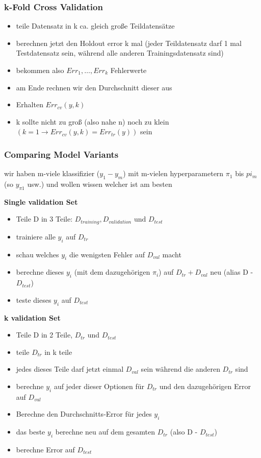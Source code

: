 \documentclass[11pt,a4paper]{article}
\begin{document}
\begin{flushleft}
\subsubsection{k-Fold Cross Validation}
\begin{itemize}
\item teile Datensatz in k ca. gleich große  Teildatensätze
\item berechnen jetzt den Holdout error k mal (jeder Teildatensatz darf 1 mal Testdatensatz sein, während alle anderen Trainingsdatensatz sind) 
\item bekommen also $Err_1, … , Err_k $  Fehlerwerte
\item am Ende rechnen wir den Durchschnitt dieser aus
\item Erhalten $Err_{cv}(y,k)$ 
\item k sollte nicht zu groß (also nahe n) noch zu klein $(k = 1 → Err_{cv}(y,k) = Err_{tr}(y))$ sein 
\end{itemize}

\subsubsection{Comparing Model Variants}
wir haben m-viele klassifizier ($y_1 - y_m$) mit m-vielen hyperparametern $\pi_1$ bis $pi_m$ (so $y_{\pi 1}$ usw.) und wollen wissen welcher ist am besten 


\textbf{Single validation Set}
\begin{itemize}
\item Teile D in 3 Teile: $D_{training} , D_{validation}  \text{ und } D_{test}$
\item trainiere alle $y_i$ auf $D_{tr}$
\item schau welches $y_i$ die wenigsten Fehler auf $D_{val}$  macht
\item berechne dieses $y_i$ (mit dem dazugehörigen $ \pi_i $) auf $D_{tr} + D_{val}$  neu (alias D - $D_{test}$)
\item teste dieses $y_i$ auf $D_{test}$
\end{itemize}

\textbf{k validation Set}
\begin{itemize}
\item Teile D in 2 Teile, $D_{tr}$  und $D_{test}$
\item teile $D_{tr}$ in k teile
\item jedes dieses Teile darf jetzt einmal $D_{val}$ sein während die anderen  $D_{tr}$ sind
\item berechne $y_i$  auf jeder dieser Optionen für $D_{tr}$ und den dazugehörigen Error auf $D_{val}$
\item Berechne den Durchschnitts-Error für jedes $y_i$ 
\item das beste $y_i$ berechne neu auf dem gesamten $D_{tr}$ (also D - $D_{test}$)
\item berechne Error auf $D_{test}$
\end{itemize}


\end{flushleft}
\end{document}
